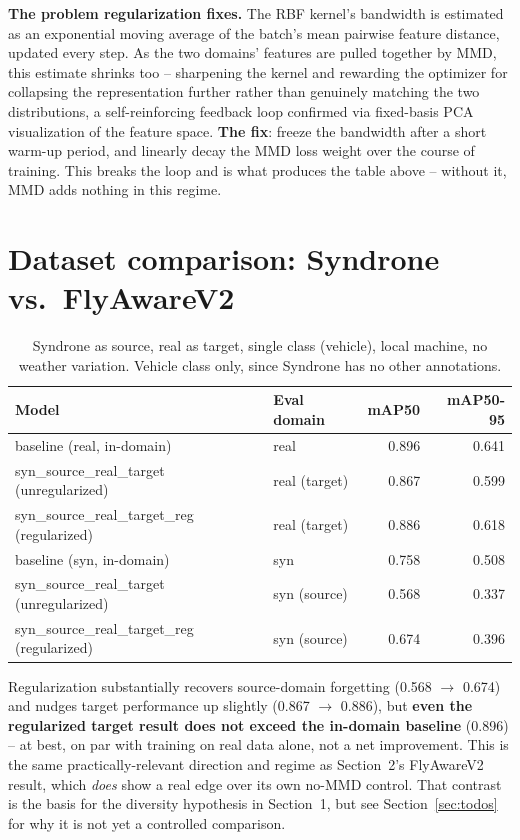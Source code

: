\documentclass[11pt]{article}
\begin{document}
\textbf{The problem regularization fixes.} The RBF kernel's bandwidth is estimated as an
exponential moving average of the batch's mean pairwise feature distance, updated every step.
As the two domains' features are pulled together by MMD, this estimate shrinks too --
sharpening the kernel and rewarding the optimizer for collapsing the representation further
rather than genuinely matching the two distributions, a self-reinforcing feedback loop
confirmed via fixed-basis PCA visualization of the feature space. \textbf{The fix}: freeze the
bandwidth after a short warm-up period, and linearly decay the MMD loss weight over the course
of training. This breaks the loop and is what produces the table above -- without it, MMD adds
nothing in this regime.

\section{Dataset comparison: Syndrone vs.\ FlyAwareV2}

\begin{table}[h!]
    \centering
    \begin{tabular}{llrr}
        \toprule
        Model & Eval domain & mAP50 & mAP50-95 \\
        \midrule
        baseline (real, in-domain) & real & 0.896 & 0.641 \\
        syn\_source\_real\_target (unregularized) & real (target) & 0.867 & 0.599 \\
        syn\_source\_real\_target\_reg (regularized) & real (target) & 0.886 & 0.618 \\
        \midrule
        baseline (syn, in-domain) & syn & 0.758 & 0.508 \\
        syn\_source\_real\_target (unregularized) & syn (source) & 0.568 & 0.337 \\
        syn\_source\_real\_target\_reg (regularized) & syn (source) & 0.674 & 0.396 \\
        \bottomrule
    \end{tabular}
    \caption{Syndrone as source, real as target, single class (vehicle), local machine, no
    weather variation. Vehicle class only, since Syndrone has no other annotations.}
\end{table}

Regularization substantially recovers source-domain forgetting (0.568 $\to$ 0.674) and nudges
target performance up slightly (0.867 $\to$ 0.886), but \textbf{even the regularized target
result does not exceed the in-domain baseline} (0.896) -- at best, on par with training on real
data alone, not a net improvement. This is the same practically-relevant direction and regime
as Section~2's FlyAwareV2 result, which \emph{does} show a real edge over its own no-MMD
control. That contrast is the basis for the diversity hypothesis in Section~1, but see
Section~\ref{sec:todos} for why it is not yet a controlled comparison.
\end{document}
